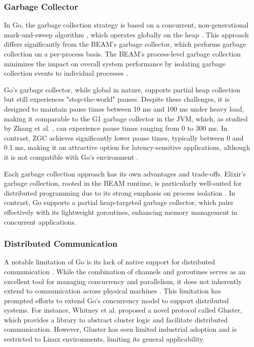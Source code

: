 \subsubsection{Garbage Collector}

In Go, the garbage collection strategy is based on a concurrent, non-generational mark-and-sweep algorithm \cite{go-docs}, which operates globally on the heap \cite{Zhao2023}. This approach differs significantly from the BEAM's garbage collector, which performs garbage collection on a per-process basis. The BEAM's process-level garbage collection minimizes the impact on overall system performance by isolating garbage collection events to individual processes \cite{Juric2024}.

Go's garbage collector, while global in nature, supports partial heap collection but still experiences "stop-the-world" pauses. Despite these challenges, it is designed to maintain pause times between 10 ms and 100 ms under heavy load, making it comparable to the G1 garbage collector in the JVM, which, as studied by Zhang et al. \cite{Zhang2021}, can experience pause times ranging from 0 to 300 ms. In contrast, ZGC achieves significantly lower pause times, typically between 0 and 0.1 ms, making it an attractive option for latency-sensitive applications, although it is not compatible with Go's environment \cite{Castro2019}.

Each garbage collection approach has its own advantages and trade-offs. Elixir’s garbage collection, rooted in the BEAM runtime, is particularly well-suited for distributed programming due to its strong emphasis on process isolation \cite{Armstrong2013}. In contrast, Go supports a partial heap-targeted garbage collector, which pairs effectively with its lightweight goroutines, enhancing memory management in concurrent applications.

\subsubsection{Distributed Communication}

A notable limitation of Go is its lack of native support for distributed communication \cite{Whitney2019, Cox-Buday2017}. While the combination of channels and goroutines serves as an excellent tool for managing concurrency and parallelism, it does not inherently extend to communication across physical machines \cite{Kennedy2016}. This limitation has prompted efforts to extend Go’s concurrency model to support distributed systems. For instance, Whitney et al. \cite{Whitney2019} proposed a novel protocol called Gluster, which provides a library to abstract cluster logic and facilitate distributed communication. However, Gluster has seen limited industrial adoption and is restricted to Linux environments, limiting its general applicability.


